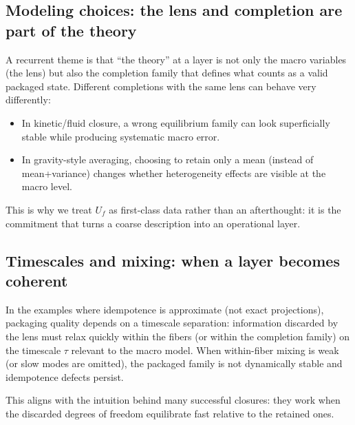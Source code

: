 \documentclass[11pt]{article}
\providecommand{\Uf}{U_f}
\begin{document}
\subsection{Modeling choices: the lens and completion are part of the theory}
A recurrent theme is that ``the theory'' at a layer is not only the macro variables (the lens) but also the completion family that defines what counts as a valid packaged state. Different completions with the same lens can behave very differently:
\begin{itemize}
  \item In kinetic/fluid closure, a wrong equilibrium family can look superficially stable while producing systematic macro error.
  \item In gravity-style averaging, choosing to retain only a mean (instead of mean+variance) changes whether heterogeneity effects are visible at the macro level.
\end{itemize}
This is why we treat $\Uf$ as first-class data rather than an afterthought: it is the commitment that turns a coarse description into an operational layer.

\subsection{Timescales and mixing: when a layer becomes coherent}
In the examples where idempotence is approximate (not exact projections), packaging quality depends on a timescale separation: information discarded by the lens must relax quickly within the fibers (or within the completion family) on the timescale $\tau$ relevant to the macro model. When within-fiber mixing is weak (or slow modes are omitted), the packaged family is not dynamically stable and idempotence defects persist.

This aligns with the intuition behind many successful closures: they work when the discarded degrees of freedom equilibrate fast relative to the retained ones.
\end{document}
